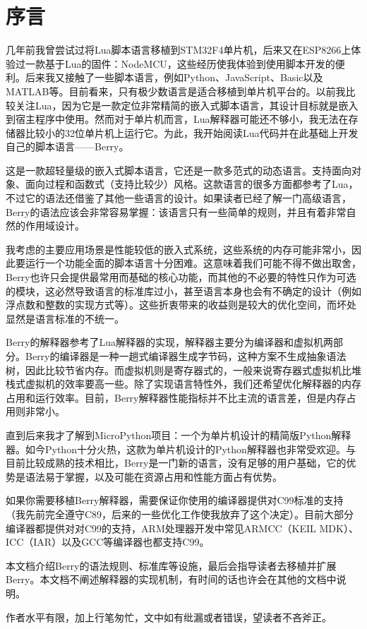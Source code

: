 \chapter*{序\quad 言}

\pagestyle{empty}
\thispagestyle{empty}

几年前我曾尝试过将Lua脚本语言移植到STM32F4单片机，后来又在ESP8266上体验过一款基于Lua的固件：NodeMCU，这些经历使我体验到使用脚本开发的便利。后来我又接触了一些脚本语言，例如Python、JavaScript、Basic以及MATLAB等。目前看来，只有极少数语言是适合移植到单片机平台的。以前我比较关注Lua，因为它是一款定位非常精简的嵌入式脚本语言，其设计目标就是嵌入到宿主程序中使用。然而对于单片机而言，Lua解释器可能还不够小，我无法在存储器比较小的32位单片机上运行它。为此，我开始阅读Lua代码并在此基础上开发自己的脚本语言------Berry。

这是一款超轻量级的嵌入式脚本语言，它还是一款多范式的动态语言。支持面向对象、面向过程和函数式（支持比较少）风格。这款语言的很多方面都参考了Lua，不过它的语法还借鉴了其他一些语言的设计。如果读者已经了解一门高级语言，Berry的语法应该会非常容易掌握：该语言只有一些简单的规则，并且有着非常自然的作用域设计。

我考虑的主要应用场景是性能较低的嵌入式系统，这些系统的内存可能非常小，因此要运行一个功能全面的脚本语言十分困难。这意味着我们可能不得不做出取舍，Berry也许只会提供最常用而基础的核心功能，而其他的不必要的特性只作为可选的模块，这必然导致语言的标准库过小，甚至语言本身也会有不确定的设计（例如浮点数和整数的实现方式等）。这些折衷带来的收益则是较大的优化空间，而坏处显然是语言标准的不统一。

Berry的解释器参考了Lua解释器的实现，解释器主要分为编译器和虚拟机两部分。Berry的编译器是一种一趟式编译器生成字节码，这种方案不生成抽象语法树，因此比较节省内存。而虚拟机则是寄存器式的，一般来说寄存器式虚拟机比堆栈式虚拟机的效率要高一些。除了实现语言特性外，我们还希望优化解释器的内存占用和运行效率。目前，Berry解释器性能指标并不比主流的语言差，但是内存占用则非常小。

直到后来我才了解到MicroPython项目：一个为单片机设计的精简版Python解释器。如今Python十分火热，这款为单片机设计的Python解释器也非常受欢迎。与目前比较成熟的技术相比，Berry是一门新的语言，没有足够的用户基础，它的优势是语法易于掌握，以及可能在资源占用和性能方面占有优势。

如果你需要移植Berry解释器，需要保证你使用的编译器提供对C99标准的支持（我先前完全遵守C89，后来的一些优化工作使我放弃了这个决定）。目前大部分编译器都提供对对C99的支持，ARM处理器开发中常见ARMCC（KEIL MDK）、ICC（IAR）以及GCC等编译器也都支持C99。

本文档介绍Berry的语法规则、标准库等设施，最后会指导读者去移植并扩展Berry。本文档不阐述解释器的实现机制，有时间的话也许会在其他的文档中说明。

作者水平有限，加上行笔匆忙，文中如有纰漏或者错误，望读者不吝斧正。



